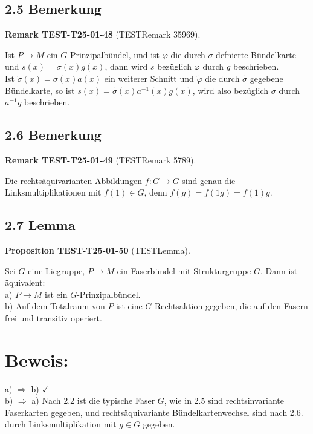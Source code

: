 \documentclass[10pt, letterpaper]{article}
\newcommand{\CustomHeading}[3]{%
  \par\medskip\noindent%
  \textbf{#1 #2} \textnormal{(#3)}.\enskip%
}
\newenvironment{PROP}[2]{\begin{unitbox}\CustomHeading{Proposition}{#1}{#2}}{\end{unitbox}}
\newenvironment{REM}[2]{\begin{unitbox}\CustomHeading{Remark}{#1}{#2}}{\end{unitbox}}
\begin{document}
\subsection*{2.5 Bemerkung}
\begin{REM}{TEST-T25-01-48}{TESTRemark 35969}
Ist $P \rightarrow M$ ein $G$-Prinzipalbündel, und ist $\varphi$ die durch $\sigma$ defnierte Bündelkarte und $s(x)=\sigma(x) g(x)$, dann wird $s$ bezüglich $\varphi$ durch $g$ beschrieben.\\
Ist $\tilde{\sigma}(x)=\sigma(x) a(x)$ ein weiterer Schnitt und $\tilde{\varphi}$ die durch $\tilde{\sigma}$ gegebene Bündelkarte, so ist $s(x)=\tilde{\sigma}(x) a^{-1}(x) g(x)$, wird also bezüglich $\tilde{\sigma}$ durch $a^{-1} g$ beschrieben.
\end{REM}

\subsection*{2.6 Bemerkung}
\begin{REM}{TEST-T25-01-49}{TESTRemark 5789}
Die rechtsäquivarianten Abbildungen $f: G \rightarrow G$ sind genau die Linksmultiplikationen mit $f(1) \in G$, denn $f(g)=f(1 g)=f(1) g$.
\end{REM}

\subsection*{2.7 Lemma}
\begin{PROP}{TEST-T25-01-50}{TESTLemma}
Sei $G$ eine Liegruppe, $P \rightarrow M$ ein Faserbündel mit Strukturgruppe $G$. Dann ist äquivalent:\\
a) $P \rightarrow M$ ist ein $G$-Prinzipalbündel.\\
b) Auf dem Totalraum von $P$ ist eine $G$-Rechtsaktion gegeben, die auf den Fasern frei und transitiv operiert.
\end{PROP}

\section*{Beweis:}
a) $\Rightarrow$ b) $\checkmark$\\
b) $\Rightarrow$ a) Nach 2.2 ist die typische Faser $G$, wie in 2.5 sind rechtsinvariante Faserkarten gegeben, und rechtsäquivariante Bündelkartenwechsel sind nach 2.6. durch Linksmultiplikation mit $g \in G$ gegeben.
\end{document}
